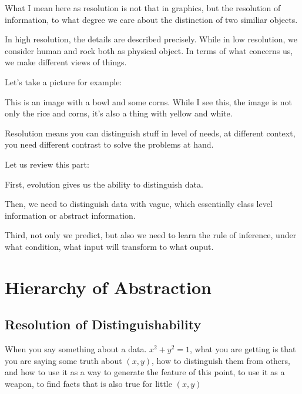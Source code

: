 What I mean here as resolution is not that in graphics, but the resolution of information, to what degree we care about the distinction of two similiar objects.

In high resolution, the details are described precisely. While in low resolution, we consider human and rock both as physical object. In terms of what concerns us, we make different views of things.

Let's take a picture for example:

This is an image with a bowl and some corns. While I see this, the image is not only the rice and corns, it's also a thing with yellow and white.

Resolution means you can distinguish stuff in level of needs, at different context, you need different contrast to solve the problems at hand.

Let us review this part:

First, evolution gives us the ability to distinguish data.

Then, we need to distinguish data with vague, which essentially class level information or abstract information.

Third, not only we predict, but also we need to learn the rule of inference, under what condition, what input will transform to what ouput.




\section{Hierarchy of Abstraction}
\subsection{Resolution of Distinguishability}

When you say something about a data. $x^2 + y^2 =1$, what you are getting is that you are saying some truth about $(x,y)$, how to distinguish them from others, and how to use it as a way to generate the feature of this point, to use it as a weapon, to find facts that is also true for little $(x, y)$
